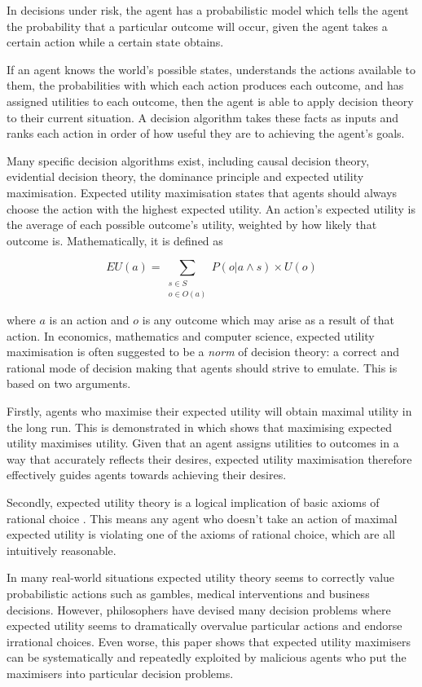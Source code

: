 \documentclass{article}
\begin{document}
In decisions under risk, the agent has a probabilistic model which tells the agent the probability that a particular outcome will occur, given the agent takes a certain action while a certain state obtains.

If an agent knows the world's possible states, understands the actions available to them, the probabilities with which each action produces each outcome, and has assigned utilities to each outcome, then the agent is able to apply decision theory to their current situation. A decision algorithm takes these facts as inputs and ranks each action in order of how useful they are to achieving the agent's goals. 

Many specific decision algorithms exist, including causal decision theory, evidential decision theory, the dominance principle and expected utility maximisation. Expected utility maximisation states that agents should always choose the action with the highest expected utility. An action's expected utility is the average of each possible outcome's utility, weighted by how likely that outcome is. Mathematically, it is defined as

\[EU(a)=\sum_{\substack{s\in S \\ o \in O(a)}}P(o|a \wedge s)\times U(o)\]

where \(a\) is an action and \(o\) is any outcome which may arise as a result of that action. In economics, mathematics and computer science, expected utility maximisation is often suggested to be a \textit{norm} of decision theory: a correct and rational mode of decision making that agents should strive to emulate. This is based on two arguments.

Firstly, agents who maximise their expected utility will obtain maximal utility in the long run. This is demonstrated in \citep{von1944games} which shows that maximising expected utility maximises utility. Given that an agent assigns utilities to outcomes in a way that accurately reflects their desires, expected utility maximisation therefore effectively guides agents towards achieving their desires. 

Secondly, expected utility theory is a logical implication of basic axioms of rational choice \citep{von1944games}. This means any agent who doesn't take an action of maximal expected utility is violating one of the axioms of rational choice, which are all intuitively reasonable.

In many real-world situations expected utility theory seems to correctly value probabilistic actions such as gambles, medical interventions and business decisions. However, philosophers have devised many decision problems where expected utility seems to dramatically overvalue particular actions and endorse irrational choices. Even worse, this paper shows that expected utility maximisers can be systematically and repeatedly exploited by malicious agents who put the maximisers into particular decision problems. 
\end{document}

